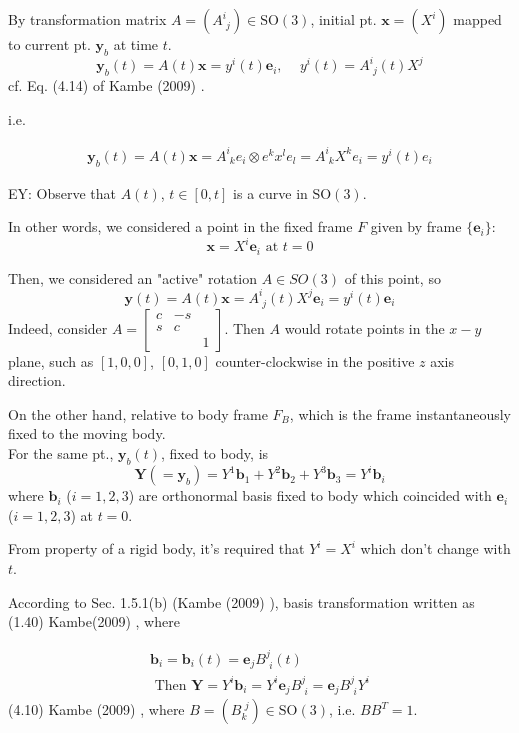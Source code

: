 \documentclass[10pt]{amsart}
\begin{document}
\begin{multicols*}{2}
By transformation matrix $A = (A^i_{ \, \, j }) \in \text{SO}(3)$, initial pt. $\mathbf{x} = (X^i)$ mapped to current pt. $\mathbf{y}_b$ at time $t$.
\begin{equation}
\mathbf{y}_b(t) = A(t) \mathbf{x} = y^i (t) \mathbf{e}_i, \quad \, y^i(t) = A^i_{ \, \, j}(t)X^j
\end{equation}
cf. Eq. (4.14) of Kambe (2009) \cite{TKambe2009}.

i.e.

\[
\begin{gathered}
\mathbf{y}_b(t) = A(t) \mathbf{x} = A^i_{\,\, k} e_i \otimes e^k x^l e_l = A^i_{ \, \, k} X^k e_i = y^i(t) e_i
\end{gathered}
\]

EY: Observe that $A(t)$, $t\in [0,t]$ is a curve in $\text{SO}(3)$.

In other words, we considered a point in the fixed frame $F$ given by frame $\lbrace \mathbf{e}_i \rbrace$:
\[
\mathbf{x} = X^i \mathbf{e}_i \text{ at } t = 0
\]

Then, we considered an "active" rotation $A \in SO(3)$ of this point, so 
\begin{equation}
	\mathbf{y}(t) = A(t) \mathbf{x} = A^i_{ \, \, j}(t) X^j \mathbf{e}_i = y^i(t) \mathbf{e}_i
\end{equation}
Indeed, consider $A = \left[ \begin{matrix} c & -s & \\ s & c & \\ & & 1 \end{matrix} \right]$. Then $A$ would rotate points in the $x-y$ plane, such as $[1, 0, 0]$, $[0, 1, 0]$ counter-clockwise in the positive $z$ axis direction.

On the other hand, relative to body frame $F_B$, which is the frame instantaneously fixed to the moving body. \\
For the same pt., $\mathbf{y}_b(t)$, fixed to body, is
\[
\mathbf{Y}(=\mathbf{y}_b) = Y^1 \mathbf{b}_1 + Y^2 \mathbf{b}_2 + Y^3 \mathbf{b}_3 = Y^i \mathbf{b}_i
\]
where $\mathbf{b}_i$ ($i=1,2,3$) are orthonormal basis fixed to body which coincided with $\mathbf{e}_i$ ($i=1,2,3$) at $t=0$. 

From property of a rigid body, it's required that $Y^i = X^i$ which don't change with $t$.

According to Sec. 1.5.1(b) (Kambe (2009) \cite{TKambe2009}), basis transformation written as (1.40) Kambe(2009) \cite{TKambe2009}, where 

\begin{equation}
\begin{gathered}
	\mathbf{b}_i = \mathbf{b}_i(t) = \mathbf{e}_j B^j_{\, \, i}(t) \\
		\text{ Then } \mathbf{Y} = Y^i \mathbf{b}_i = Y^i \mathbf{e}_j B^j_{ \, \, i} = \mathbf{e}_j B^j_{\, \, i } Y^i
\end{gathered}
\end{equation} 
(4.10) Kambe (2009) \cite{TKambe2009}, where $B = (B_k^{\, \, j}) \in \text{SO}(3)$, i.e. $BB^T = 1$. \\


\end{multicols*}
\end{document}
